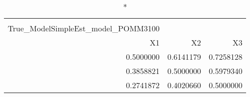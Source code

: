 \begin{longtable}{rrr}
\caption*{
{\large Pestmatrix} \\ 
{\small True\_ModelSimpleEst\_model\_POMM3100}
} \\ 
\toprule
X1 & X2 & X3 \\ 
\midrule
0.5000000 & 0.6141179 & 0.7258128 \\ 
0.3858821 & 0.5000000 & 0.5979340 \\ 
0.2741872 & 0.4020660 & 0.5000000 \\ 
\bottomrule
\end{longtable}

